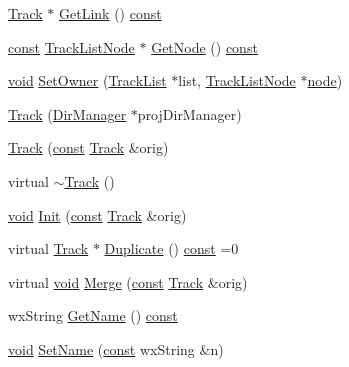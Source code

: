 \begin{DoxyCompactItemize}
\item 
\hyperlink{class_track}{Track} $\ast$ \hyperlink{class_track_afafc93348a2d442bf956fa072d3d769b}{Get\+Link} () \hyperlink{getopt1_8c_a2c212835823e3c54a8ab6d95c652660e}{const} 
\item 
\hyperlink{getopt1_8c_a2c212835823e3c54a8ab6d95c652660e}{const} \hyperlink{struct_track_list_node}{Track\+List\+Node} $\ast$ \hyperlink{class_track_a4439c1f48c56aee62e09b2ea7c0a2124}{Get\+Node} () \hyperlink{getopt1_8c_a2c212835823e3c54a8ab6d95c652660e}{const} 
\item 
\hyperlink{sound_8c_ae35f5844602719cf66324f4de2a658b3}{void} \hyperlink{class_track_abea3b67734ed3ac7f9873fa7fdb86c82}{Set\+Owner} (\hyperlink{class_track_list}{Track\+List} $\ast$list, \hyperlink{struct_track_list_node}{Track\+List\+Node} $\ast$\hyperlink{structnode}{node})
\item 
\hyperlink{class_track_a108c752f54d215d88076e1feaf55f65c}{Track} (\hyperlink{class_dir_manager}{Dir\+Manager} $\ast$proj\+Dir\+Manager)
\item 
\hyperlink{class_track_a5e133fa07f696db6d2bbdc440ce3a010}{Track} (\hyperlink{getopt1_8c_a2c212835823e3c54a8ab6d95c652660e}{const} \hyperlink{class_track}{Track} \&orig)
\item 
virtual \hyperlink{class_track_a416e75e66accc8eb9e3fafc3e8555216}{$\sim$\+Track} ()
\item 
\hyperlink{sound_8c_ae35f5844602719cf66324f4de2a658b3}{void} \hyperlink{class_track_a947a448d4a6e9c7f2a6e4f36fb017ba5}{Init} (\hyperlink{getopt1_8c_a2c212835823e3c54a8ab6d95c652660e}{const} \hyperlink{class_track}{Track} \&orig)
\item 
virtual \hyperlink{class_track}{Track} $\ast$ \hyperlink{class_track_a7de9a5b87c0309271bc2620c9ed54545}{Duplicate} () \hyperlink{getopt1_8c_a2c212835823e3c54a8ab6d95c652660e}{const}  =0
\item 
virtual \hyperlink{sound_8c_ae35f5844602719cf66324f4de2a658b3}{void} \hyperlink{class_track_a0345783930c487b7b511f8419f068aa5}{Merge} (\hyperlink{getopt1_8c_a2c212835823e3c54a8ab6d95c652660e}{const} \hyperlink{class_track}{Track} \&orig)
\item 
wx\+String \hyperlink{class_track_a670b88686f99e151d6a305a709f130b1}{Get\+Name} () \hyperlink{getopt1_8c_a2c212835823e3c54a8ab6d95c652660e}{const} 
\item 
\hyperlink{sound_8c_ae35f5844602719cf66324f4de2a658b3}{void} \hyperlink{class_track_af91d1579e3d15a0d5fffa3348adae753}{Set\+Name} (\hyperlink{getopt1_8c_a2c212835823e3c54a8ab6d95c652660e}{const} wx\+String \&n)

\end{DoxyCompactItemize}
